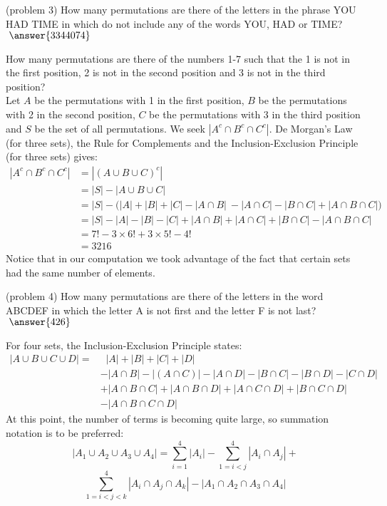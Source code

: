 \documentclass[handout]{ximera}
\begin{document}
\begin{problem}(problem 3)
How many permutations are there of the letters in the phrase YOU HAD TIME in which do not include any of the  
 words YOU, HAD or TIME? $\; \answer{3344074}$
\end{problem}

\begin{example}[example 4]
How many permutations are there of the numbers 1-7 such that the 1 is not in the first position, 2 is not in the 
second position and 3 is not in the third position?\\
Let $A$ be the permutations with 1 in the first position, $B$ be the permutations with 2 in the 
second position, $C$ be the permutations with 3 in the third position and $S$ be the set of all permutations. 
We seek $|A^c \cap B^c \cap C^c|$. 
De Morgan's Law (for three sets), the Rule for Complements and the Inclusion-Exclusion Principle (for three sets) gives:
\begin{align*}
|A^c \cap B^c \cap C^c| &= |(A \cup B \cup C)^c|\\
               &= |S| - |A\cup B \cup C|\\
               &= |S| - \Big(|A| + |B| + |C| - |A\cap B|\ - |A\cap C| - |B\cap C| + |A \cap B \cap C| \Big)\\
               &= |S| - |A| - |B| - |C| + |A\cap B| + |A\cap C| + |B\cap C| - |A\cap B \cap C|\\
               &= 7! - 3 \times 6! + 3 \times 5! - 4!\\
               &= 3216
\end{align*}
Notice that in our computation we took advantage of the fact that certain sets had the same number of elements.
\end{example}

\begin{problem}(problem 4)
How many permutations are there of the letters in the word ABCDEF in which the letter A is not 
first and the letter F is not last? $\; \answer{426}$
\end{problem}





For four sets, the Inclusion-Exclusion Principle states:
\begin{align*}
|A \cup B \cup C \cup D | = &\;\;|A|  + |B| + |C| + |D| \\
&- |A \cap B| - | (A \cap C)| - |A \cap D| - |B\cap C| - | B \cap D| 
- |C \cap D| \\
& +|A\cap B\cap C| + |A\cap B\cap D|+|A\cap C\cap D|+| B\cap C\cap D| \\
&- |A\cap B\cap C \cap D|
\end{align*}
At this point, the number of terms is becoming quite large, so summation notation is to be preferred:
\[
|A_1 \cup A_2 \cup A_3 \cup A_4 | = \sum_{i = 1}^4 |A_i| - \sum_{1 = i < j}^4 |A_i \cap A_j| + 
\]
\[
\sum_{1 = i < j< k }^4 |A_i \cap A_j \cap A_k| - |A_1 \cap A_2 \cap A_3 \cap A_4 |
\]
\end{document}
